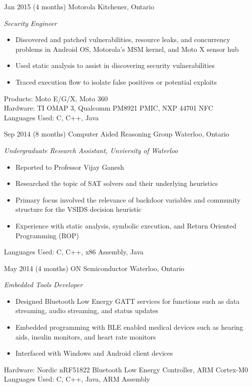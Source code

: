 \documentclass[print]{friggeri-cv} %
\begin{document}
\begin{entrylist}

\entry
{Jan 2015}
{(4 months)}
{Motorola}
{Kitchener, Ontario}
{\emph{Security Engineer}
\begin{itemize}
\item Discovered and patched vulnerabilities, resource leaks, and concurrency problems in Android OS, Motorola's MSM kernel, and Moto X sensor hub
\item Used static analysis to assist in discovering security vulnerabilities
\item Traced execution flow to isolate false positives or potential exploits
\end{itemize}
Products: Moto E/G/X, Moto 360 \\
Hardware: TI OMAP 3, Qualcomm PM8921 PMIC, NXP 44701 NFC \\
Languages Used: C, C++, Java \\
}

\entry
{Sep 2014}
{(8 months)}
{Computer Aided Reasoning Group}
{Waterloo, Ontario}
{\emph{Undergraduate Research Assistant, Unviersity of Waterloo}
\begin{itemize}
\item Reported to Professor Vijay Ganesh 
\item Researched the topic of SAT solvers and their underlying heuristics
\item Primary focus involved the relevance of backdoor variables and community structure for the VSIDS decision heuristic
\item Experience with static analysis, symbolic execution, and Return Oriented Programming (ROP) 
\end{itemize}
Languages Used: C, C++, x86 Assembly, Java \\
}

\entry
{May 2014}
{(4 months)}
{ON Semiconductor}
{Waterloo, Ontario}
{\emph{Embedded Tools Developer}
\begin{itemize}
\item Designed Bluetooth Low Energy GATT services for functions such as data streaming, audio streaming, and status updates
\item Embedded programming with BLE enabled medical devices such as hearing aids, insulin monitors, and heart rate monitors
\item Interfaced with Windows and Android client devices
\end{itemize}
Hardware: Nordic nRF51822 Bluetooth Low Energy Controller, ARM Cortex-M0 \\
Languages Used: C, C++, Java, ARM Assembly \\
}


\end{entrylist}
\end{document}
